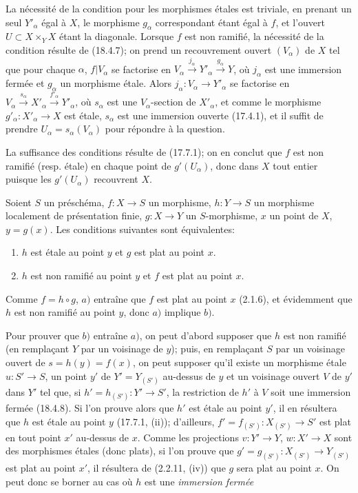 La nécessité de la condition pour les morphismes étales est triviale, en prenant un seul $Y'_\alpha$ égal à $X$, le morphisme $g_\alpha$ correspondant étant égal à $f$, et l'ouvert $U\subset X\times_Y X$ étant la diagonale. Lorsque $f$ est non ramifié, la nécessité de la condition résulte de (18.4.7); on prend un recouvrement ouvert $(V_\alpha)$ de $X$ tel que pour chaque $\alpha$, $f|V_\alpha$ se factorise en $V_\alpha\xrightarrow{j_\alpha}Y'_\alpha\xrightarrow{g_\alpha}Y$, où $j_\alpha$ est une immersion fermée et $g_\alpha$ un morphisme étale. Alors $j_\alpha:V_\alpha\to Y'_\alpha$ se factorise en $V_\alpha\xrightarrow{s_\alpha}X'_\alpha\xrightarrow{f'_\alpha}Y'_\alpha$, où $s_\alpha$ est une $V_\alpha$-section de $X'_\alpha$, et comme le morphisme $g'_\alpha:X'_\alpha\to X$ est étale, $s_\alpha$ est une immersion ouverte (17.4.1), et il suffit de prendre $U_\alpha=s_\alpha(V_\alpha)$ pour répondre à la question.

La suffisance des conditions résulte de (17.7.1); on en conclut que $f$ est non ramifié (resp. étale) en chaque point de $g'(U_\alpha)$, donc dans $X$ tout entier puisque les $g'(U_\alpha)$ recouvrent $X$.

\begin{proposition}[18.4.9]
\label{IV.18.4.9}
Soient $S$ un préschéma, $f:X\to S$ un morphisme, $h:Y\to S$ un morphisme localement de présentation finie, $g:X\to Y$ un $S$-morphisme, $x$ un point de $X$, $y=g(x)$. Les conditions suivantes sont équivalentes:
\begin{enumerate}
  \item[a)] $h$ est étale au point $y$ et $g$ est plat au point $x$.
  \item[b)] $h$ est non ramifié au point $y$ et $f$ est plat au point $x$.
\end{enumerate}
\end{proposition}

Comme $f=h\circ g$, $a)$ entraîne que $f$ est plat au point $x$ (2.1.6), et évidemment que $h$ est non ramifié au point $y$, donc $a)$ implique $b)$.

Pour prouver que $b)$ entraîne $a)$, on peut d'abord supposer que $h$ est non ramifié (en remplaçant $Y$ par un voisinage de $y$); puis, en remplaçant $S$ par un voisinage ouvert de $s=h(y)=f(x)$, on peut supposer qu'il existe un morphisme étale $u:S'\to S$, un point $y'$ de $Y'=Y_{(S')}$ au-dessus de $y$ et un voisinage ouvert $V$ de $y'$ dans $Y'$ tel que, si $h'=h_{(S')}:Y'\to S'$, la restriction de $h'$ à $V$ soit une immersion fermée (18.4.8). Si l'on prouve alors que $h'$ est étale au point $y'$, il en résultera que $h$ est étale au point $y$ (17.7.1, (ii)); d'ailleurs, $f'=f_{(S')}:X_{(S')}\to S'$ est plat en tout point $x'$ au-dessus de $x$. Comme les projections $v:Y'\to Y$, $w:X'\to X$ sont des morphismes étales (donc plats), si l'on prouve que $g'=g_{(S')}:X_{(S')}\to Y_{(S')}$ est plat au point $x'$, il résultera de (2.2.11, (iv)) que $g$ sera plat au point $x$. On peut donc se borner au cas où $h$ est une \emph{immersion fermée}

